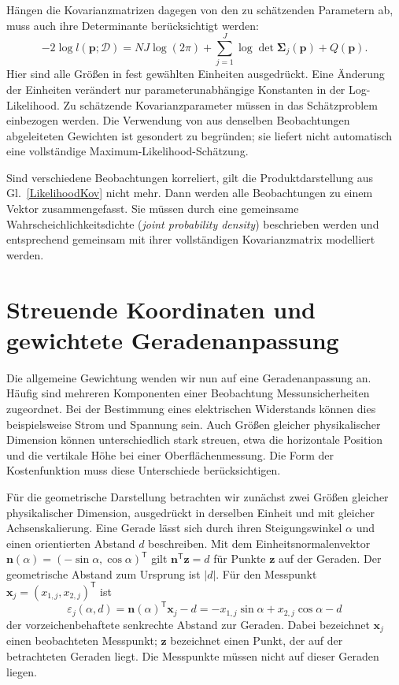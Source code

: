 Hängen die Kovarianzmatrizen dagegen von den zu schätzenden Parametern
ab, muss auch ihre Determinante berücksichtigt werden:
\begin{equation}
-2\log l(\mathbf{p};\mathcal{D})
=NJ\log(2\pi)+\sum_{j=1}^{J}\log\det\boldsymbol{\Sigma}_j(\mathbf{p})
+Q(\mathbf{p}).
\label{KonzepteLogdet}
\end{equation}
Hier sind alle Größen in fest gewählten Einheiten ausgedrückt.
Eine Änderung der Einheiten verändert nur parameterunabhängige
Konstanten in der Log-Likelihood.
Zu schätzende Kovarianz\-parameter müssen in das Schätzproblem einbezogen
werden. Die Verwendung von aus denselben Beobachtungen abgeleiteten
Gewichten ist gesondert zu begründen; sie liefert nicht automatisch
eine vollständige Maximum-Likelihood-Schätzung.

Sind verschiedene Beobachtungen korreliert, gilt die
Produktdarstellung aus Gl.~\eqref{LikelihoodKov} nicht mehr. Dann werden alle
Beobachtungen zu einem Vektor zusammengefasst. Sie müssen durch eine gemeinsame Wahrscheichlichkeitsdichte (\textsl{joint probability density}) beschrieben werden und entsprechend gemeinsam mit ihrer vollständigen Kovarianzmatrix modelliert werden.

\section{Streuende Koordinaten und gewichtete Geradenanpassung}
\label{V4StreuendeKoordinaten}

Die allgemeine Gewichtung wenden wir nun auf eine Geradenanpassung an.
Häufig sind mehreren Komponenten einer Beobachtung Messunsicherheiten
zugeordnet. Bei der Bestimmung eines elektrischen Widerstands können dies
beispielsweise Strom und Spannung sein. Auch Größen gleicher
physikalischer Dimension können unterschiedlich stark streuen, etwa
die horizontale Position und die vertikale Höhe bei einer
Oberflächenmessung. Die Form der Kostenfunktion muss diese Unterschiede
berücksichtigen.

Für die geometrische Darstellung betrachten wir zunächst zwei Größen
gleicher physikalischer Dimension, ausgedrückt in derselben Einheit und
mit gleicher Achsenskalierung. Eine Gerade lässt sich durch ihren
Steigungswinkel $\alpha$ und einen orientierten Abstand $d$ beschreiben.
Mit dem Einheitsnormalenvektor
$\mathbf{n}(\alpha)=(-\sin\alpha,\cos\alpha)^\mathsf{T}$ gilt
$\mathbf{n}^{\mathsf{T}}\mathbf{z}=d$ für Punkte $\mathbf{z}$ auf der
Geraden. Der geometrische Abstand zum Ursprung ist $|d|$.
Für den Messpunkt $\mathbf{x}_j=(x_{1,j},x_{2,j})^\mathsf{T}$ ist
\begin{equation}
\varepsilon_j(\alpha,d)
=\mathbf{n}(\alpha)^{\mathsf{T}}\mathbf{x}_j-d
=-x_{1,j}\sin\alpha+x_{2,j}\cos\alpha-d
\label{TLSgerade}
\end{equation}
der vorzeichenbehaftete senkrechte Abstand zur Geraden. Dabei bezeichnet
$\mathbf{x}_j$ einen beobachteten Messpunkt; $\mathbf{z}$ bezeichnet
einen Punkt, der auf der betrachteten Geraden liegt. Die Messpunkte
müssen nicht auf dieser Geraden liegen.



